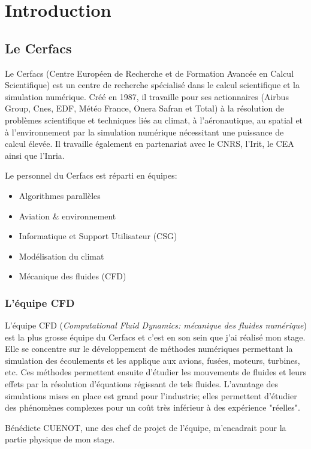 \section{Introduction}
\subsection{Le Cerfacs}\label{sec:intro}

Le Cerfacs (Centre Européen de Recherche et de Formation Avancée en Calcul Scientifique) est un centre de recherche spécialisé dans le calcul scientifique et la simulation numérique. Créé en 1987, il travaille pour ses actionnaires (Airbus Group, Cnes, EDF, Météo France, Onera Safran et Total) à la résolution de problèmes scientifique et techniques liés au climat, à l'aéronautique, au spatial et à l'environnement par la simulation numérique nécessitant une puissance de calcul élevée. Il travaille également en partenariat avec le CNRS, l'Irit, le CEA ainsi que l'Inria.


Le personnel du Cerfacs est réparti en équipes:
\begin{itemize}
\item Algorithmes parallèles
\item Aviation \& environnement
\item Informatique et Support Utilisateur (CSG)
\item Modélisation du climat
\item Mécanique des fluides (CFD)
\end{itemize}

\subsubsection{L'équipe CFD}
L'équipe CFD (\textit{Computational Fluid Dynamics: mécanique des fluides numérique}) est la plus grosse équipe du Cerfacs et c'est en son sein que j'ai réalisé mon stage. Elle se concentre sur le développement de méthodes numériques permettant la simulation des écoulements et les applique aux avions, fusées, moteurs, turbines, etc. Ces méthodes permettent ensuite d'étudier les mouvements de fluides et leurs effets par la résolution d'équations régissant de tels fluides. L'avantage des simulations mises en place est grand pour l'industrie; elles permettent d'étudier des phénomènes complexes pour un coût très inférieur à des expérience "réelles".

Bénédicte CUENOT, une des chef de projet de l'équipe, m'encadrait pour la partie physique de mon stage.


